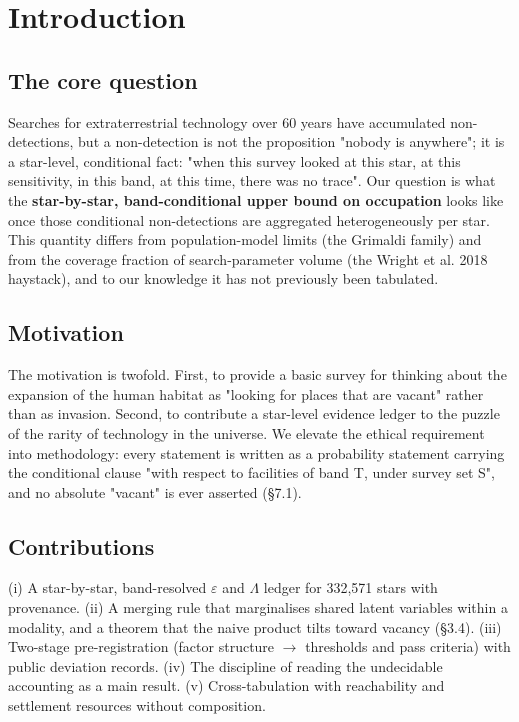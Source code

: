 \documentclass{aa}
\begin{document}
\section{Introduction}

\subsection{The core question}
\noindent Searches for extraterrestrial technology over 60 years have accumulated non-detections, but a non-detection is not the proposition "nobody is anywhere"; it is a star-level, conditional fact: "when this survey looked at this star, at this sensitivity, in this band, at this time, there was no trace". Our question is what the \textbf{star-by-star, band-conditional upper bound on occupation} looks like once those conditional non-detections are aggregated heterogeneously per star. This quantity differs from population-model limits (the Grimaldi family) and from the coverage fraction of search-parameter volume (the Wright et al. 2018 haystack), and to our knowledge it has not previously been tabulated.\par\smallskip

\subsection{Motivation}
\noindent The motivation is twofold. First, to provide a basic survey for thinking about the expansion of the human habitat as "looking for places that are vacant" rather than as invasion. Second, to contribute a star-level evidence ledger to the puzzle of the rarity of technology in the universe. We elevate the ethical requirement into methodology: every statement is written as a probability statement carrying the conditional clause "with respect to facilities of band T, under survey set S", and no absolute "vacant" is ever asserted (\S{}7.1).\par\smallskip

\subsection{Contributions}
\noindent (i) A star-by-star, band-resolved \(\varepsilon\) and \(\Lambda\) ledger for 332,571 stars with provenance. (ii) A merging rule that marginalises shared latent variables within a modality, and a theorem that the naive product tilts toward vacancy (\S{}3.4). (iii) Two-stage pre-registration (factor structure \(\rightarrow\) thresholds and pass criteria) with public deviation records. (iv) The discipline of reading the undecidable accounting as a main result. (v) Cross-tabulation with reachability and settlement resources without composition.\par\smallskip
\end{document}
